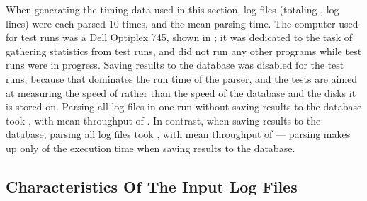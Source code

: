 When generating the timing data used in this section, \numberOFlogFILES{}
log files (totaling ,
\numberOFlogLINEShuman{} log lines) were each parsed 10 times, and the mean
parsing time.  The computer used for test runs was a Dell Optiplex 745,
shown in ; it
was dedicated to the task of gathering statistics from test runs, and did
not run any other programs while test runs were in progress.  Saving
results to the database was disabled for the test runs, because that
dominates the run time of the parser, and the tests are aimed at measuring
the speed of \parsername{} rather than the speed of the database and the
disks it is stored on.  Parsing all \numberOFlogFILES{} log files in one
run without saving results to the database took
, with mean throughput of
.  In contrast, when saving
results to the database, parsing all \numberOFlogFILES{} log files took
, with mean throughput of
 --- parsing makes up only
 of the
execution time when saving results to the database.

\subsection{Characteristics Of The Input Log Files}

